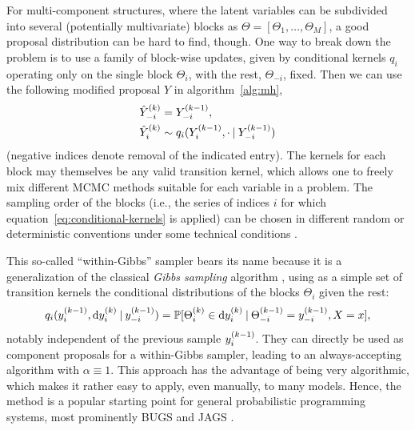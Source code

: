 For multi-component structures, where the latent variables can be subdivided into several
(potentially multivariate) blocks as \(\Theta = [\Theta_1, \ldots, \Theta_M]\), a good proposal
distribution can be hard to find, though.  One way to break down the problem is to use a family of
block-wise updates, given by conditional kernels \(q_{i}\) operating only on the single block
\(\Theta_i\), with the rest, \(\Theta_{-i}\), fixed.  Then we can use the following modified
proposal \(\hat{Y}\) in algorithm~\ref{alg:mh},
\begin{equation}
  \label{eq:conditional-kernels}
  \begin{aligned}
    \kth[k]{\hat{Y}}_{-i} &= \kth[k-1]{Y}_{-i}, \\
    \kth[k]{\hat{Y}}_{i} &\from q_{i}(\kth[k-1]{Y}_{i}, \cdot \given \kth[k-1]{Y}_{-i})
  \end{aligned}
\end{equation}
(negative indices denote removal of the indicated entry).  The kernels for each block may themselves
be any valid transition kernel, which allows one to freely mix different MCMC methods suitable for
each variable in a problem.  The sampling order of the blocks (i.e., the series of indices \(i\) for
which equation~\eqref{eq:conditional-kernels} is applied) can be chosen in different random or
deterministic conventions under some technical conditions \parencite[see][chapter
6.6]{vihola2020lectures}.

This so-called \enquote{within-Gibbs} sampler bears its name because it is a generalization of the
classical \emph{Gibbs sampling} algorithm \parencite{geman1984stochastic}, using as a simple set of
transition kernels the conditional distributions of the blocks \(\Theta_i\) given the rest:
\begin{equation}
  \label{eq:gibbs-conditional-kernel}
  q_{i}(\kth[k-1]{y}_{i}, \dif \kth{y}_{i} \given \kth[k-1]{y}_{-i}) =
  \Prob{\kth{\Theta}_{i} \in \dif\kth{y}_{i} \given \kth[k-1]{\Theta}_{-i} = \kth[k-1]{y}_{-i}, X = x},
\end{equation}
notably independent of the previous sample \(\kth[k-1]{y}_{i}\).  They can directly be used as
component proposals for a within-Gibbs sampler, leading to an always-accepting algorithm with
\(\alpha \equiv 1\).  This approach has the advantage of being very algorithmic, which makes it
rather easy to apply, even manually, to many models.  Hence, the method is a popular starting point
for general probabilistic programming systems, most prominently BUGS
\parencite{lunn2000winbugs,lunn2009bugs} and JAGS \parencite{plummer2003jags,plummer2017jags}.

